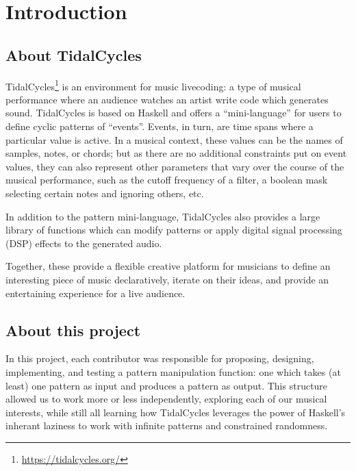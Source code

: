 \section{Introduction}

\subsection{About TidalCycles}

TidalCycles\footnote{\url{https://tidalcycles.org/}} is an environment for music livecoding:
a type of musical performance where an audience watches an artist write code which generates sound.
TidalCycles is based on Haskell and offers a ``mini-language'' for users to define cyclic patterns of ``events''.
Events, in turn, are time spans where a particular value is active.
In a musical context, these values can be the names of samples, notes, or chords;
but as there are no additional constraints put on event values,
they can also represent other parameters that vary over the course of the musical performance,
such as the cutoff frequency of a filter,
a boolean mask selecting certain notes and ignoring others,
etc.

In addition to the pattern mini-language,
TidalCycles also provides a large library of functions which can modify patterns or apply digital signal processing (DSP) effects to the generated audio.

Together, these provide a flexible creative platform for musicians to define an interesting piece of music declaratively, iterate on their ideas, and provide an entertaining experience for a live audience.

\subsection{About this project}

In this project,
each contributor was responsible for proposing, designing, implementing, and testing a pattern manipulation function:
one which takes (at least) one pattern as input and produces a pattern as output.
This structure allowed us to work more or less independently,
exploring each of our musical interests,
while still all learning how TidalCycles leverages the power of Haskell's inherant laziness
to work with infinite patterns and constrained randomness.
